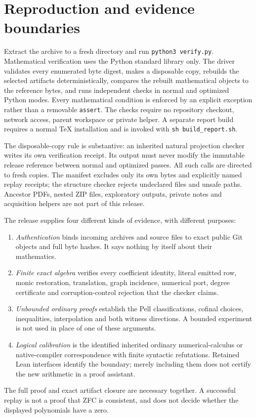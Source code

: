 \section{Reproduction and evidence boundaries}
Extract the archive to a fresh directory and run \texttt{python3 verify.py}. Mathematical verification uses the Python standard library only. The driver validates every enumerated byte digest, makes a disposable copy, rebuilds the selected artifacts deterministically, compares the rebuilt mathematical objects to the reference bytes, and runs independent checks in normal and optimized Python modes. Every mathematical condition is enforced by an explicit exception rather than a removable \texttt{assert}. The checks require no repository checkout, network access, parent workspace or private helper. A separate report build requires a normal TeX installation and is invoked with \texttt{sh build\_report.sh}.

The disposable-copy rule is substantive: an inherited natural projection checker writes its own verification receipt. Its output must never modify the immutable release reference between normal and optimized passes. All such calls are directed to fresh copies. The manifest excludes only its own bytes and explicitly named replay receipts; the structure checker rejects undeclared files and unsafe paths. Ancestor PDFs, nested ZIP files, exploratory outputs, private notes and acquisition helpers are not part of this release.

The release supplies four different kinds of evidence, with different purposes:
\begin{enumerate}
\item \emph{Authentication} binds incoming archives and source files to exact public Git objects and full byte hashes. It says nothing by itself about their mathematics.
\item \emph{Finite exact algebra} verifies every coefficient identity, literal emitted row, monic restoration, translation, graph incidence, numerical port, degree certificate and corruption-control rejection that the checker claims.
\item \emph{Unbounded ordinary proofs} establish the Pell classifications, cofinal choices, inequalities, interpolation and both witness directions. A bounded experiment is not used in place of one of these arguments.
\item \emph{Logical calibration} is the identified inherited ordinary numerical-calculus or native-compiler correspondence with finite syntactic refutations. Retained Lean interfaces identify the boundary; merely including them does not certify the new arithmetic in a proof assistant.
\end{enumerate}
The full proof and exact artifact closure are necessary together. A successful replay is not a proof that ZFC is consistent, and does not decide whether the displayed polynomials have a zero.

